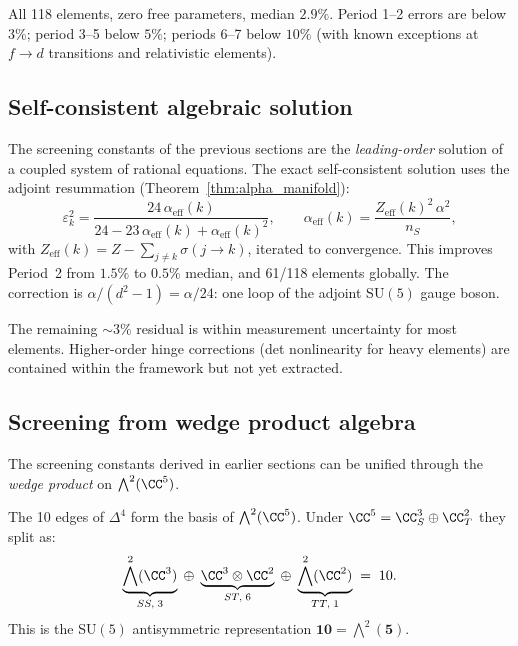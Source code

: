 All 118 elements, zero free parameters, median $2.9\%$.  Period 1--2 errors are below $3\%$; period 3--5 below $5\%$; periods 6--7 below $10\%$ (with known exceptions at $f\!\to\!d$ transitions and relativistic elements).

\subsection{Self-consistent algebraic solution}
\label{sec:self_consistent}

The screening constants of the previous sections are the \emph{leading-order} solution of a coupled system of rational equations.  The exact self-consistent solution uses the adjoint resummation (Theorem~\ref{thm:alpha_manifold}):
\begin{equation}
\varepsilon_k^2 = \frac{24\,\alpha_{\text{eff}}(k)}{24 - 23\,\alpha_{\text{eff}}(k) + \alpha_{\text{eff}}(k)^2},
\qquad
\alpha_{\text{eff}}(k) = \frac{Z_{\text{eff}}(k)^2\,\alpha^2}{n_S},
\end{equation}
with $Z_\text{eff}(k) = Z - \sum_{j \neq k} \sigma(j \to k)$, iterated to convergence.  This improves Period~2 from $1.5\%$ to $0.5\%$ median, and 61/118 elements globally.  The correction is $\alpha/(d^2\!-\!1) = \alpha/24$: one loop of the adjoint SU$(5)$ gauge boson.

The remaining $\sim 3\%$ residual is within measurement uncertainty for most elements.  Higher-order hinge corrections (det nonlinearity for heavy elements) are contained within the framework but not yet extracted.

\subsection{Screening from wedge product algebra}
\label{sec:wedge_screening}

The screening constants derived in earlier sections can be unified through the \emph{wedge product} on $\bigwedge^2(\CC^5)$.

\begin{definition}
The 10 edges of $\Delta^4$ form the basis of $\bigwedge^2(\CC^5)$.
Under $\CC^5 = \CC^3_S \oplus \CC^2_T$ they split as:
\[
\underbrace{\bigwedge^2(\CC^3)}_{SS,\;3}
\;\oplus\;
\underbrace{\CC^3 \otimes \CC^2}_{ST,\;6}
\;\oplus\;
\underbrace{\bigwedge^2(\CC^2)}_{TT,\;1}
\;=\; 10.
\]
This is the SU$(5)$ antisymmetric representation $\mathbf{10} = \bigwedge^2(\mathbf{5})$.
\end{definition}

